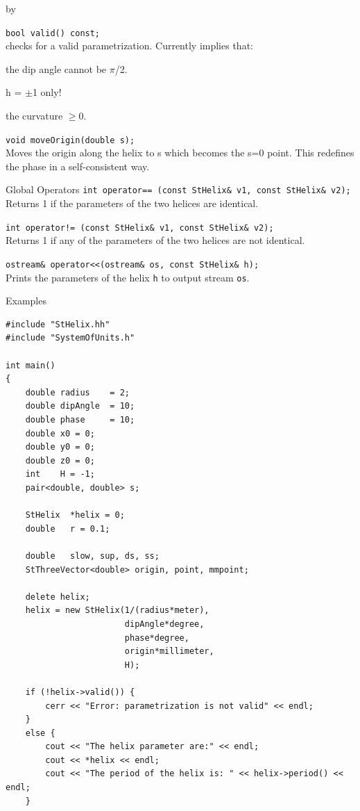 \documentclass[twoside]{article}
\newcommand{\comp}[1]{\texttt{#1}}%
\newcommand{\entrylabel}[1]{\mbox{\textbf{{#1}}}\hfil}%
\newenvironment{entry}
{\begin{list}{}%
    {\renewcommand{\makelabel}{\entrylabel}%
     \setlength{\labelwidth}{90pt}%
     \setlength{\leftmargin}{\labelwidth}
     \advance\leftmargin by \labelsep%
      }%
    }%
  {\end{list}}
\newcommand{\Entrylabel}[1]%
{\raisebox{0pt}[1ex][0pt]{\makebox[\labelwidth][l]%
    {\parbox[t]{\labelwidth}{\hspace{0pt}\textbf{{#1}}}}}}
\newenvironment{Entry}%
{\renewcommand{\entrylabel}{\Entrylabel}\begin{entry}}%
  {\end{entry}}
\begin{document}
\begin{Entry}
    \verb+bool valid() const;+\\
    checks for a valid parametrization.  Currently implies that:
    \begin{description}
      \item the dip angle cannot be $\pi$/2.
      \item h = $\pm$1 only!
      \item the curvature $\geq$0.
    \end{description}

    \verb+void moveOrigin(double s);+\\
    Moves the origin along the helix to s which becomes the
    s=0 point.  This redefines the phase in a self-consistent way.
    
\item[Global Operators]
    \verb+int operator== (const StHelix& v1, const StHelix& v2);+\\
    Returns 1 if the parameters of the two helices are identical.

    \verb+int operator!= (const StHelix& v1, const StHelix& v2);+\\
    Returns 1 if any of the parameters of the two helices are not
    identical.


    \verb+ostream& operator<<(ostream& os, const StHelix& h);+\\
    Prints the parameters of the helix \comp{h} to output
    stream \comp{os}.
    \newpage
    
\item[Examples]
{\footnotesize
\begin{verbatim}
#include "StHelix.hh"
#include "SystemOfUnits.h"

int main()
{
    double radius    = 2;
    double dipAngle  = 10;
    double phase     = 10;
    double x0 = 0;
    double y0 = 0;
    double z0 = 0;
    int    H = -1;
    pair<double, double> s;
    
    StHelix  *helix = 0;
    double   r = 0.1;
 
    double   slow, sup, ds, ss;
    StThreeVector<double> origin, point, mmpoint;

    delete helix;
    helix = new StHelix(1/(radius*meter),
                        dipAngle*degree,
                        phase*degree,
                        origin*millimeter,
                        H);

    if (!helix->valid()) {
        cerr << "Error: parametrization is not valid" << endl;
    }
    else {
        cout << "The helix parameter are:" << endl;
        cout << *helix << endl;
        cout << "The period of the helix is: " << helix->period() << endl;
    }


\end{verbatim}}
\end{Entry}
\end{document}
